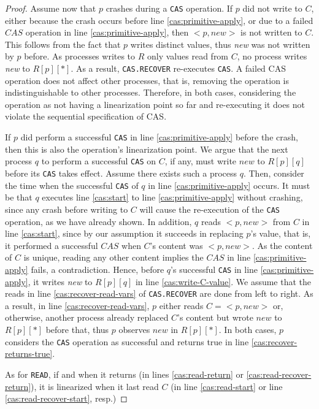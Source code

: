 \begin{proof}
Assume now that $p$ crashes during a \texttt{CAS} operation.
	If $p$ did not write to $C$, either because the crash occurs before line \ref{cas:primitive-apply}, or due to a failed $CAS$ operation in line \ref{cas:primitive-apply}, then ${<}p,new{>}$ is not written to $C$. This follows from the fact that $p$ writes distinct values, thus \emph{new} was not written by $p$ before. As processes writes to $R$ only values read from $C$, no process writes \emph{new} to $R[p][*]$. As a result, \texttt{CAS.RECOVER} re-executes \texttt{CAS}. A failed CAS operation does not affect other processes, that is, removing the operation is indistinguishable to other processes. Therefore, in both cases, considering the operation as not having a linearization point so far and re-executing it does not violate the sequential specification of CAS.
	
	If $p$ did perform a successful \texttt{CAS} in line \ref{cas:primitive-apply} before the crash, then this is also the operation's linearization point. We argue that the next process $q$ to perform a successful \texttt{CAS} on $C$, if any, must write $new$ to $R[p][q]$ before its \texttt{CAS} takes effect. Assume there exists such a process $q$. Then, consider the time when the successful \texttt{CAS} of $q$ in line \ref{cas:primitive-apply} occurs. It must be that $q$ executes line \ref{cas:start} to line \ref{cas:primitive-apply} without crashing, since any crash before writing to $C$ will cause the re-execution of the \texttt{CAS} operation, as we have already shown. In addition, $q$ reads ${<}p,new{>}$ from $C$ in line \ref{cas:start}, since by our assumption it succeeds in replacing $p$'s value, that is, it performed a successful $CAS$ when $C$'s content was ${<}p,new{>}$. As the content of $C$ is unique, reading any other content implies the $CAS$ in line \ref{cas:primitive-apply} fails, a contradiction. Hence, before $q$'s successful \texttt{CAS} in line \ref{cas:primitive-apply}, it writes \emph{new} to $R[p][q]$ in line \ref{cas:write-C-value}.
	We assume that the reads in line \ref{cas:recover-read-vars} of \texttt{CAS.RECOVER} are done from left to right. As a result, in line \ref{cas:recover-read-vars}, $p$ either reads $C={<}p,new{>}$ or, otherwise, another process already replaced $C$'s content but wrote $new$ to $R[p][*]$ before that, thus $p$ observes $new$ in $R[p][*]$. In both cases, $p$ considers the \texttt{CAS} operation as successful and returns true in line \ref{cas:recover-returns-true}.
	
	 As for \texttt{READ}, if and when it returns (in lines \ref{cas:read-return} or \ref{cas:read-recover-return}), it is linearized when it last read $C$ (in line \ref{cas:read-start} or line \ref{cas:read-recover-start}, resp.)
	

\end{proof}

